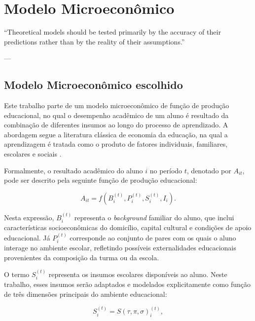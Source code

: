 \chapter{Modelo Microeconômico} \label{sec:micromodel}
\epigraphfontsize{\small\itshape}
\setlength\epigraphwidth{8cm}
\setlength\epigraphrule{0pt}
\epigraphfontsize{\small\itshape}
\epigraph{``Theoretical models should be tested primarily by the accuracy of their predictions rather than by the reality of their assumptions.''}{--- \textup{\textcite{downs1957economic}}}

\section{Modelo Microeconômico escolhido}


\noindent Este trabalho parte de um modelo microeconômico de função de produção educacional, no qual o desempenho acadêmico de um aluno é resultado da combinação de diferentes insumos ao longo do processo de aprendizado. A abordagem segue a literatura clássica de economia da educação, na qual a aprendizagem é tratada como o produto de fatores individuais, familiares, escolares e sociais \cite{funcaodeproducaoeducacional}.

Formalmente, o resultado acadêmico do aluno $i$ no período $t$, denotado por $A_{it}$, pode ser descrito pela seguinte função de produção educacional:

\begin{equation}
A_{it} = f \left( B_{i}^{(t)}, P_{i}^{(t)}, S_{i}^{(t)}, I_i \right).
\end{equation}

Nesta expressão, $B_{i}^{(t)}$ representa o \textit{background} familiar do aluno, que inclui características socioeconômicas do domicílio, capital cultural e condições de apoio educacional. Já $P_{i}^{(t)}$ corresponde ao conjunto de pares com os quais o aluno interage no ambiente escolar, refletindo possíveis externalidades educacionais provenientes da composição da turma ou da escola.

O termo $S_{i}^{(t)}$ representa os insumos escolares disponíveis ao aluno. Neste trabalho, esses insumos serão adaptados e modelados explicitamente como função de três dimensões principais do ambiente educacional:

\begin{equation} 
S_{i}^{(t)} = S(\tau,\pi,\sigma)_{i}^{(t)}, 
\end{equation}

